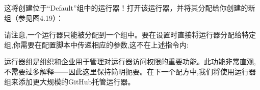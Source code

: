 \begin{enumerate}
这将创建位于“Default”组中的运行器！打开该运行器，并将其分配给你创建的新组（参见图4.19）：


请注意,一个运行器只能被分配到一个组中。要在设置时直接将运行器分配给特定组,你需要在配置脚本中传递相应的参数,这不在上述指令内:


\end{enumerate}

运行器组是组织和企业用于管理对运行器访问权限的重要功能。此功能非常直观,不需要过多解释——因此这里保持简明扼要。在下一个配方中,我们将使用运行器组来添加更大规模的GitHub托管运行器。